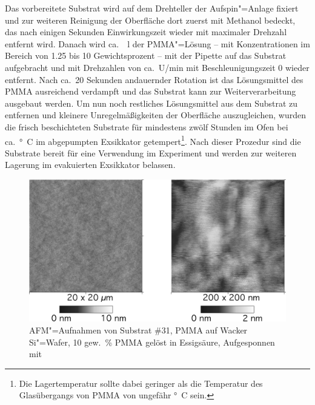 \enlargethispage{-1\baselineskip}
Das vorbereitete Substrat wird auf dem Drehteller der Aufspin"=Anlage fixiert und zur weiteren Reinigung der Oberfläche dort zuerst mit Methanol bedeckt, das nach einigen Sekunden Einwirkungszeit wieder mit maximaler Drehzahl entfernt wird. Danach wird ca.\ \unit[100]{\grmu l}  der PMMA"=Lösung -- mit Konzentrationen im Bereich von 1.25 bis 10 Gewichtsprozent -- mit der Pipette auf das Substrat aufgebracht und mit Drehzahlen von ca.\ \unit[4500]{U/min} mit Beschleunigungszeit 0 wieder entfernt. Nach ca.\ 20 Sekunden andauernder Rotation ist das Lösungsmittel des PMMA ausreichend verdampft und das Substrat kann zur Weiterverarbeitung ausgebaut werden. Um nun noch restliches Lösungsmittel aus dem Substrat zu entfernen und kleinere  
Unregelmäßigkeiten der Oberfläche auszugleichen, wurden die frisch beschichteten Substrate für mindestens zwölf Stunden im Ofen bei ca.\ \unit[60]{\degree C} im abgepumpten Exsikkator getempert\footnote{Die Lagertemperatur sollte dabei geringer als die Temperatur des Glasübergangs von PMMA von ungefähr \unit[80]{\degree C} sein.}. Nach dieser Prozedur sind die Substrate bereit für eine Verwendung im Experiment und werden zur weiteren Lagerung im evakuierten Exsikkator belassen.
\begin{figure}[h!tbp]
	\includegraphics{exp_substrate/PMMA_AFM}
	\begin{minipage}[b]{\linewidth-\tabcolsep-10.3cm}
	\caption[AFM"=Aufnahmen der Oberfläche eines PMMA"=Substrats]{AFM"=Aufnahmen von Substrat \#31, PMMA auf Wacker Si"=Wafer, 10 gew.~\% PMMA gelöst in Essigsäure, Aufgesponnen mit }
	\label{fig:afm_pmma}
	\end{minipage}
\end{figure}

